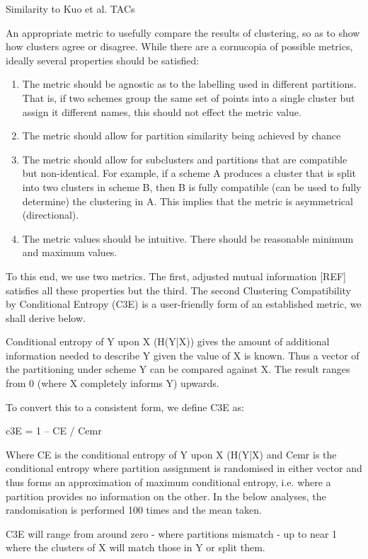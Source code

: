 \documentclass[9pt,twocolumn,twoside]{pnas-new}
\begin{document}
Similarity to Kuo et al. TACs

An appropriate metric to usefully compare the results of clustering, so as to show how clusters agree or disagree. While there are a cornucopia of possible metrics, ideally several properties should be satisfied: 

\begin{enumerate}
\item The metric should be agnostic as to the labelling used in different partitions. That is, if two schemes group the same set of points into a single cluster but assign it different names, this should not effect the metric value.
\item The metric should allow for partition similarity being achieved by chance
\item The metric should allow for subclusters and partitions that are compatible but non-identical. For example, if a scheme A produces a cluster that is split into two clusters in scheme B, then B is fully compatible (can be used to fully determine) the clustering in A. This implies that the metric is asymmetrical (directional).
\item The metric values should be intuitive. There should be reasonable minimum and maximum values.
\end{enumerate}

To this end, we use two metrics. The first, adjusted mutual information [REF] satisfies all these properties but the third. The second Clustering Compatibility by Conditional Entropy (C3E) is a user-friendly form of an established metric, we shall derive below.

Conditional entropy of Y upon X (H(Y|X)) gives the amount of additional information needed to describe Y given the value of X is known. Thus a vector of the partitioning under scheme Y can be compared against X. The result ranges from 0 (where X completely informs Y) upwards. 

To convert this to a consistent form, we define C3E as:

c3E = 1 – CE / Cemr

Where CE is the conditional entropy of Y upon X (H(Y|X) and Cemr is  the conditional entropy where partition assignment is randomised in either vector and thus forms an approximation of maximum conditional entropy, i.e. where a partition provides no information on the other. In the below analyses, the randomisation is performed 100 times and the mean taken.

C3E will range from around zero  - where partitions mismatch - up to near 1 where the clusters of X will match those in Y or split them.
\end{document}
